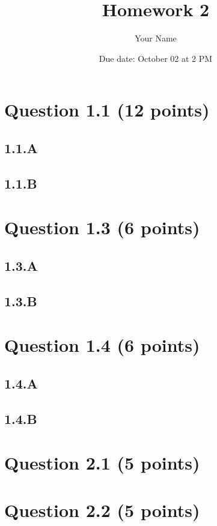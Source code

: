 \documentclass{article}
\title{Homework 2}
\author{Your Name}
\date{Due date: October 02 at 2 PM}
\begin{document}
\maketitle

\section*{Question 1.1 (12 points)}

\subsection*{1.1.A}

\subsection*{1.1.B}


\section*{Question 1.3 (6 points)}

\subsection*{1.3.A}

\subsection*{1.3.B}


\section*{Question 1.4 (6 points)}

\subsection*{1.4.A}

\subsection*{1.4.B}


\section*{Question 2.1 (5 points)}


\section*{Question 2.2 (5 points)}
\end{document}
